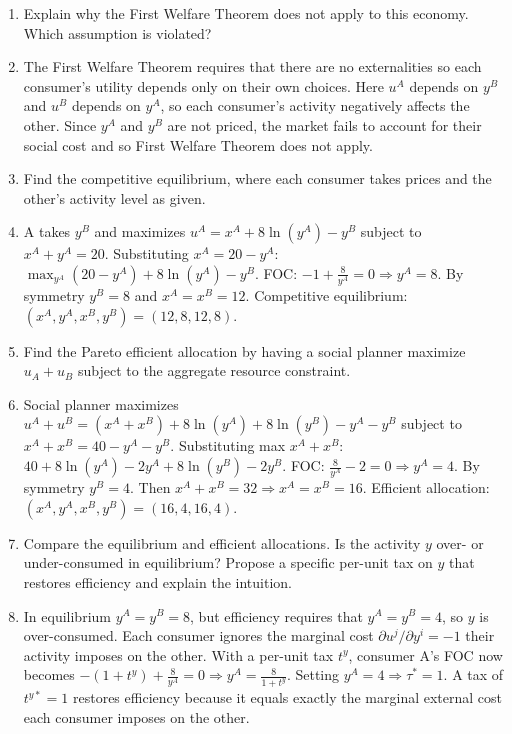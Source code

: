 \documentclass[11pt]{article}
\begin{document}
\begin{enumerate}[label=(\alph*)]

\item[ (a) ] [4 points] Explain why the First Welfare Theorem does not apply to this economy. Which assumption is violated?
\item[] The First Welfare Theorem requires that there are no externalities so each consumer's utility depends only on their own choices. Here $u^A$ depends on $y^B$ and $u^B$ depends on $y^A$, so each consumer's activity negatively affects the other. Since $y^A$ and $y^B$ are not priced, the market fails to account for their social cost and so First Welfare Theorem does not apply.

\item[ (b) ] [6 points] Find the competitive equilibrium, where each consumer takes prices and the other's activity level as given.
\item[] A takes $y^B$ and maximizes $u^A=x^A+8\ln(y^A)-y^B$ subject to $x^A+y^A=20$. Substituting $x^A=20-y^A$: $\max_{y^A}(20-y^A)+8\ln(y^A)-y^B$. FOC: $-1+\frac{8}{y^A}=0\Rightarrow y^A=8$. By symmetry $y^B=8$ and $x^A=x^B=12$. Competitive equilibrium: $(x^A,y^A,x^B,y^B)=(12,8,12,8)$.

\item[ (c) ] [6 points] Find the Pareto efficient allocation by having a social planner maximize $u_A + u_B$ subject to the aggregate resource constraint.
\item[] Social planner maximizes $u^A+u^B=(x^A+x^B)+8\ln(y^A)+8\ln(y^B)-y^A-y^B$ subject to $x^A+x^B=40-y^A-y^B$. Substituting max $x^A+x^B$: $40+8\ln(y^A)-2y^A+8\ln(y^B)-2y^B$. FOC: $\frac{8}{y^A}-2=0\Rightarrow y^A=4$. By symmetry $y^B=4$. Then $x^A+x^B=32\Rightarrow x^A=x^B=16$. Efficient allocation: $(x^A,y^A,x^B,y^B)=(16,4,16,4)$.

\item[ (d) ] [4 points] Compare the equilibrium and efficient allocations. Is the activity $y$ over- or under-consumed in equilibrium? Propose a specific per-unit tax on $y$ that restores efficiency and explain the intuition.
\item[] In equilibrium $y^A=y^B=8$, but efficiency requires that $y^A=y^B=4$, so $y$ is over-consumed. Each consumer ignores the marginal cost $\partial u^j/\partial y^i=-1$ their activity imposes on the other. With a per-unit tax $t^y$, consumer A's FOC now becomes $-(1+t^y)+\frac{8}{y^A}=0\Rightarrow y^A=\frac{8}{1+t^y}$. Setting $y^A=4\Rightarrow\tau^*=1$. A tax of $t^{y*}=1$ restores efficiency because it equals exactly the marginal external cost each consumer imposes on the other.

\end{enumerate}
\end{document}

